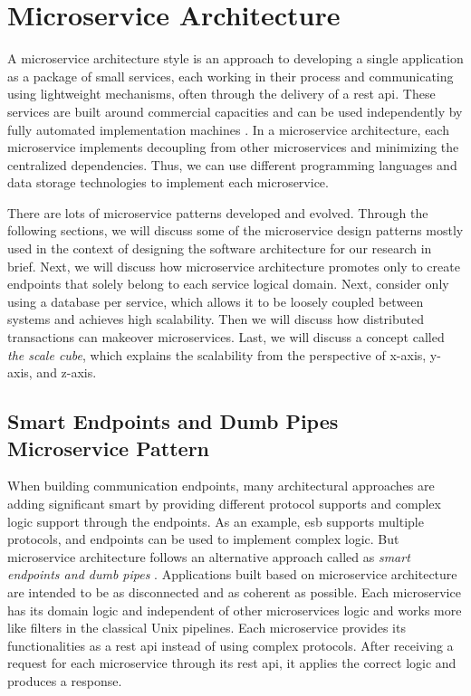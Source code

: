 \section{Microservice Architecture}
\label{se:microservice}

A microservice architecture style is an approach to developing a single application as a package of small services, each working in their process and communicating using lightweight mechanisms, often through the delivery of a \acrfull{rest} \acrshort{api}. These services are built around commercial capacities and can be used independently by fully automated implementation machines \cite{LewisMicroservices}. In a microservice architecture, each microservice implements decoupling from other microservices and minimizing the centralized dependencies. Thus, we can use different programming languages and data storage technologies to implement each microservice.

There are lots of microservice patterns developed and evolved. Through the following sections, we will discuss some of the microservice design patterns mostly used in the context of designing the software architecture for our research in brief. Next, we will discuss how microservice architecture promotes only to create endpoints that solely belong to each service logical domain. Next, consider only using a database per service, which allows it to be loosely coupled between systems and achieves high scalability. Then we will discuss how distributed transactions can makeover microservices. Last, we will discuss a concept called \emph{the scale cube}, which explains the scalability from the perspective of x-axis, y-axis, and z-axis.


\subsection{Smart Endpoints and Dumb Pipes  Microservice Pattern}
\label{subse:dumb_pipes}

When building communication endpoints, many architectural approaches are adding significant smart by providing different protocol supports and complex logic support through the endpoints. As an example, \acrshort{esb} supports multiple protocols, and endpoints can be used to implement complex logic. But microservice architecture follows an alternative approach called as \emph{smart endpoints and dumb pipes} \cite{LewisMicroservicesPipes}. Applications built based on microservice architecture are intended to be as disconnected and as coherent as possible. Each microservice has its domain logic and independent of other microservices logic and works more like filters in the classical Unix pipelines. Each microservice provides its functionalities as a \acrshort{rest} \acrshort{api} instead of using complex protocols. After receiving a request for each microservice through its \acrshort{rest} \acrshort{api}, it applies the correct logic and produces a response.

